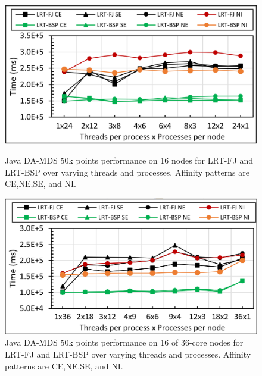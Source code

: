\documentclass[10pt, conference, compsocconf]{IEEEtran}
\begin{document}
\begin{figure}[!htb]
	\begin{minipage}{0.49\textwidth}
        \centering
        \includegraphics[width=1\columnwidth]{images/fig_damds_50k_binding_patterns}
        \caption{Java DA-MDS 50k points performance on 16 nodes for \ac{LRT-FJ} and \ac{LRT-BSP} over varying threads and processes. Affinity patterns are CE,NE,SE, and NI.}
        \label{fig:fig_damds_50k_binding_patterns}
    \end{minipage}
    \hspace{1.4mm}
    \begin{minipage}{0.49\textwidth}
        \centering
        \includegraphics[width=1\columnwidth]{images/fig_damds_50k_binding_patterns_on_36core_nodes}
        \caption{Java DA-MDS 50k points performance on 16 of 36-core nodes for \ac{LRT-FJ} and \ac{LRT-BSP} over varying threads and processes. Affinity patterns are CE,NE,SE, and NI.}
        \label{fig:fig_damds_50k_binding_patterns_on_36core_nodes}
    \end{minipage}
\end{figure}
\end{document}
